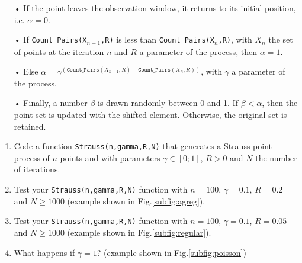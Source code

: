 \begin{enumerate}
\item[•] If the point leaves the observation window, it returns to its initial position, i.e. $\alpha=0$.
\item[•] If \texttt{Count\_Pairs(X$_{n+1}$,R)} is less than \texttt{Count\_Pairs(X$_{n}$,R)}, with $X_n$ the set of points at the iteration $n$ and $R$ a parameter of the process, then $\alpha=1$.
\item[•] Else $\alpha =\gamma^{\left(\texttt{Count\_Pairs}(X_{n+1},R)-\texttt{Count\_Pairs}(X_{n},R)\right)}$, with $\gamma$ a parameter of the process.
\item[•] Finally, a number $\beta$ is drawn randomly between 0 and 1. If $\beta<\alpha$, then the point set is updated with the shifted element. Otherwise, the original set is retained.
\end{enumerate}

\begin{qbox}

\begin{enumerate}
\item 
Code a function \texttt{Strauss(n,gamma,R,N)} that generates a Strauss point process of $n$ points and with parameters $\gamma\in[0;1]$, $R>0$ and $N$ the number of iterations.

\item Test your \texttt{Strauss(n,gamma,R,N)} function with $n=100$, $\gamma = 0.1$, $R=0.2$ and $N\geq 1000$ (example shown in Fig.\ref{subfig:agreg}).
\item Test your \texttt{Strauss(n,gamma,R,N)} function with $n=100$, $\gamma = 0.1$, $R=0.05$ and $N\geq 1000$ (example shown in Fig.\ref{subfig:regular}).
\item What happens if $\gamma = 1$? (example shown in Fig.\ref{subfig:poisson})
\end{enumerate}

\end{qbox}

